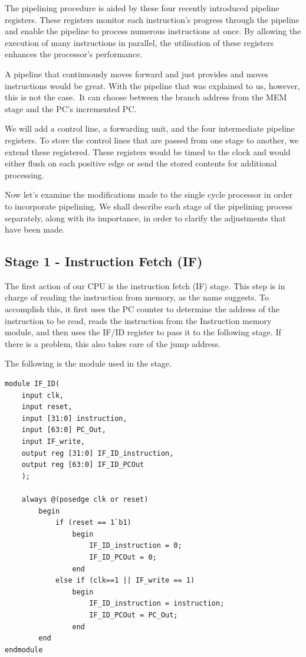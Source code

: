 \documentclass{article}
\begin{document}
The pipelining procedure is aided by these four recently introduced pipeline registers. These registers monitor each instruction's progress through the pipeline and enable the pipeline to process numerous instructions at once. By allowing the execution of many instructions in parallel, the utilisation of these registers enhances the processor's performance.

A pipeline that continuously moves forward and just provides and moves instructions would be great. With the pipeline that was explained to us, however, this is not the case. It can choose between the branch address from the MEM stage and the PC's incremented PC. 

We will add a control line, a forwarding unit, and the four intermediate pipeline registers. To store the control lines that are passed from one stage to another, we extend these registered. These registers would be timed to the clock and would either flush on each positive edge or send the stored contents for additional processing.

Now let's examine the modifications made to the single cycle processor in order to incorporate pipelining. We shall describe each stage of the pipelining process separately, along with its importance, in order to clarify the adjustments that have been made. 


\subsection{Stage 1 - Instruction Fetch (IF)}

The first action of our CPU is the instruction fetch (IF) stage. This step is in charge of reading the instruction from memory, as the name suggests. To accomplish this, it first uses the PC counter to determine the address of the instruction to be read, reads the instruction from the Instruction memory module, and then uses the IF/ID register to pass it to the following stage. If there is a problem, this also takes care of the jump address.

The following is the module used in the stage. 

\begin{lstlisting}[caption={IF/ID Register}, captionpos=b, language=RISC-V]
module IF_ID(
    input clk,
    input reset,
    input [31:0] instruction,
    input [63:0] PC_Out,
    input IF_write,
    output reg [31:0] IF_ID_instruction,
    output reg [63:0] IF_ID_PCOut
    );
    
    always @(posedge clk or reset)
        begin
            if (reset == 1`b1)
                begin
                    IF_ID_instruction = 0;
                    IF_ID_PCOut = 0;
                end
            else if (clk==1 || IF_write == 1)
                begin
                    IF_ID_instruction = instruction;
                    IF_ID_PCOut = PC_Out;
                end
        end   
endmodule
\end{lstlisting}
\end{document}
